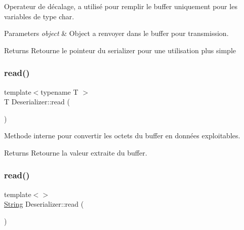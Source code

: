 Operateur de décalage, a utilisé pour remplir le buffer uniquement pour les variables de type char. 


\begin{DoxyParams}{Parameters}
{\em object} & Object a renvoyer dans le buffer pour transmission.\\
\hline
\end{DoxyParams}
\begin{DoxyReturn}{Returns}
Retourne le pointeur du serializer pour une utilisation plus simple 
\end{DoxyReturn}
\mbox{\label{struct_deserializer_af93dc898d561ad0b1d8b86ddf49053ca}} 
\subsubsection{\texorpdfstring{read()}{read()}\hspace{0.1cm}{\footnotesize\ttfamily [1/2]}}
{\footnotesize\ttfamily template$<$typename T $>$ \\
T Deserializer\+::read (\begin{DoxyParamCaption}{ }\end{DoxyParamCaption})\hspace{0.3cm}{\ttfamily [inline]}}



Methode interne pour convertir les octets du buffer en données exploitables. 

\begin{DoxyReturn}{Returns}
Retourne la valeur extraite du buffer. 
\end{DoxyReturn}
\mbox{\label{struct_deserializer_aefa095423e11239219f8a472547a6d22}} 
\subsubsection{\texorpdfstring{read()}{read()}\hspace{0.1cm}{\footnotesize\ttfamily [2/2]}}
{\footnotesize\ttfamily template$<$$>$ \\
\hyperlink{serialutils_8h_afbeda3fd1bdc8c37d01bdf9f5c8274ff}{String} Deserializer\+::read (\begin{DoxyParamCaption}{ }\end{DoxyParamCaption})\hspace{0.3cm}{\ttfamily [inline]}}




